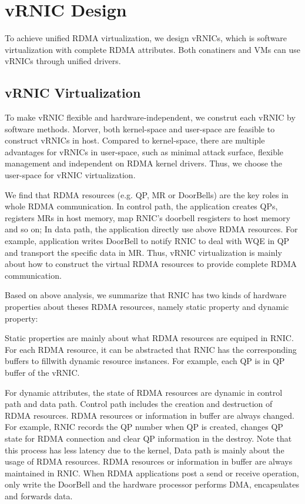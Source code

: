 \section{vRNIC Design}
To achieve unified RDMA virtualization, we design vRNICs, which is software virtualization with complete RDMA attributes. Both conatiners and VMs can use vRNICs through unified drivers. 

\subsection{vRNIC Virtualization}

To make vRNIC flexible and hardware-independent, we construt each vRNIC by software methods. Morver, both kernel-space and user-space are feasible to construct vRNICs in host. Compared to kernel-space, there are multiple advantages for vRNICs in user-space, such as minimal attack surface, flexible management and independent on RDMA kernel drivers. Thus, we choose the user-space for vRNIC virtualization.

We find that RDMA resources (e.g. QP, MR or DoorBells) are the key roles in whole RDMA communication. In control path, the application creates QPs, registers MRs in host memory, map RNIC's doorbell resgisters to host memory and so on; In data path, the application directly use above RDMA resources. For example, application writes DoorBell to notify RNIC to deal with WQE in QP and transport the specific data in MR. Thus, vRNIC virtualization is mainly about how to construct the virtual RDMA resources to provide complete RDMA communication. 

Based on above analysis, we summarize that RNIC has two kinds of hardware properties about theses RDMA resources, namely static property and dynamic property:

Static properties are mainly about what RDMA resources are equiped in RNIC. For each RDMA resource, it can be abstracted that RNIC has the corresponding buffers to fillwith dynamic resource instances. For example, each QP is in QP buffer of the vRNIC.

For dynamic attributes, the state of RDMA resources are dynamic in control path and data path. Control path includes the creation and destruction of RDMA resources. RDMA resources or information in buffer are always changed. For example, RNIC records the QP number when QP is created, changes QP state for RDMA connection and clear QP information in the destroy. Note that this process has less latency due to the kernel, Data path is mainly about the usage of RDMA resources. RDMA resources or information in buffer are always maintained in RNIC. When RDMA applications post a send or receive operation, only write the DoorBell and the hardware processor performs DMA, encapsulates and forwards data.

